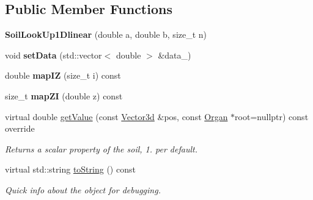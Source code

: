 \subsection*{Public Member Functions}
\begin{DoxyCompactItemize}
\item 
\mbox{\label{classCPlantBox_1_1SoilLookUp1Dlinear_aea2977104009690dc9e84ee691786b04}} 
{\bfseries Soil\+Look\+Up1\+Dlinear} (double a, double b, size\+\_\+t n)
\item 
\mbox{\label{classCPlantBox_1_1SoilLookUp1Dlinear_ab6aa21f531b94c6cf51035f284eaf1e4}} 
void {\bfseries set\+Data} (std\+::vector$<$ double $>$ \&data\+\_\+)
\item 
\mbox{\label{classCPlantBox_1_1SoilLookUp1Dlinear_aabf6cd414dce412ff38a2fb0abee95a3}} 
double {\bfseries map\+IZ} (size\+\_\+t i) const
\item 
\mbox{\label{classCPlantBox_1_1SoilLookUp1Dlinear_ac76a01708047a46d00e486d1bbf55053}} 
size\+\_\+t {\bfseries map\+ZI} (double z) const
\item 
virtual double \hyperlink{classCPlantBox_1_1SoilLookUp1Dlinear_ae2d2ada13590b9b118f207f647652db8}{get\+Value} (const \hyperlink{classCPlantBox_1_1Vector3d}{Vector3d} \&pos, const \hyperlink{classCPlantBox_1_1Organ}{Organ} $\ast$root=nullptr) const override
\begin{DoxyCompactList}\small\item\em Returns a scalar property of the soil, 1. per default. \end{DoxyCompactList}\item 
\mbox{\label{classCPlantBox_1_1SoilLookUp1Dlinear_a533fb76f35407f118f36b3ca4339a79c}} 
virtual std\+::string \hyperlink{classCPlantBox_1_1SoilLookUp1Dlinear_a533fb76f35407f118f36b3ca4339a79c}{to\+String} () const
\begin{DoxyCompactList}\small\item\em Quick info about the object for debugging. \end{DoxyCompactList}\end{DoxyCompactItemize}
